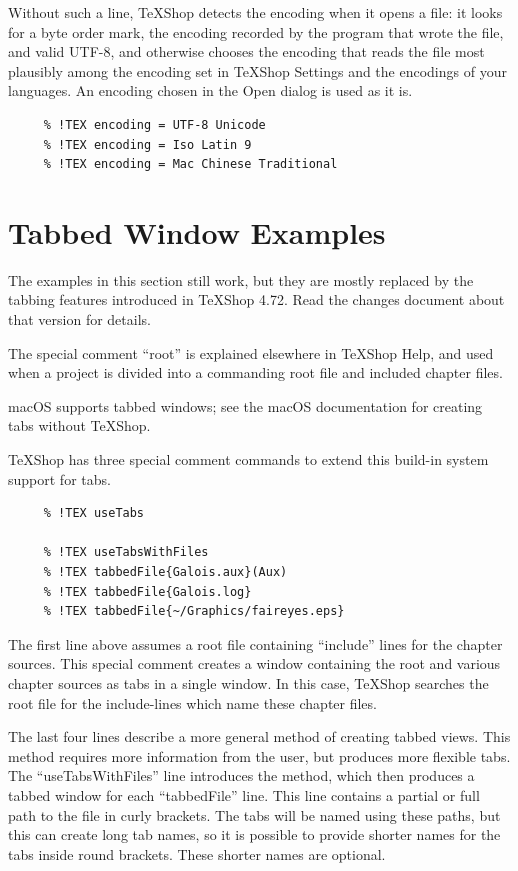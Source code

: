 \documentclass[11pt, oneside]{article}   	%
\begin{document}
Without such a line, TeXShop detects the encoding when it opens a file: it looks for a byte order mark, the encoding recorded by the program that wrote the file, and valid UTF-8, and otherwise chooses the encoding that reads the file most plausibly among the encoding set in TeXShop Settings and the encodings of your languages. An encoding chosen in the Open dialog is used as it is.

 \begin{verbatim}    
     % !TEX encoding = UTF-8 Unicode
     % !TEX encoding = Iso Latin 9
     % !TEX encoding = Mac Chinese Traditional
 \end{verbatim}    
   
 \section{Tabbed Window Examples}
 
 The examples in this section still work, but they are mostly replaced by the tabbing features introduced in TeXShop 4.72. Read the changes document about that version for details.
  
 The special comment ``root'' is explained elsewhere in TeXShop Help, and used when a project is divided into a commanding root file and included chapter files. 
 
 macOS supports tabbed windows; see the macOS documentation for creating tabs without TeXShop.
  
 TeXShop has three special comment commands to extend this build-in system support for tabs. 
 
 \begin{verbatim}
     % !TEX useTabs
	
     % !TEX useTabsWithFiles
     % !TEX tabbedFile{Galois.aux}(Aux)
     % !TEX tabbedFile{Galois.log}
     % !TEX tabbedFile{~/Graphics/faireyes.eps}
 \end{verbatim}
 The first line above assumes a root file containing ``include'' lines for the chapter sources. This special comment creates a window containing the root and various chapter sources as tabs in a single window.
 In this case, TeXShop searches the root file for the include-lines which name these chapter files.
 
 The last four lines describe a more general method of creating tabbed views. This method requires more
 information from the user, but produces more flexible tabs. The ``useTabsWithFiles'' line introduces the method, which then produces a tabbed window for each ``tabbedFile'' line. This line contains a partial or full path to the file in curly brackets. The tabs will be named using these paths, but this can create long tab names, so it is possible to provide  shorter names for the tabs inside round brackets. These
 shorter names are optional.
 
\end{document}
